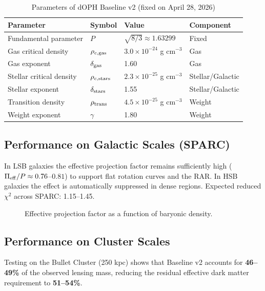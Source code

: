 \documentclass[11pt,a4paper]{article}
\begin{document}
\begin{table}[htbp]
\centering
\caption{Parameters of dOPH Baseline v2 (fixed on April 28, 2026)}
\label{tab:baseline_v2}
\begin{tabular}{llll}
\toprule
Parameter & Symbol & Value & Component \\
\midrule
Fundamental parameter & $P$ & $\sqrt{8/3} \approx 1.63299$ & Fixed \\
Gas critical density & $\rho_{c,\rm gas}$ & $3.0 \times 10^{-24}$ g cm$^{-3}$ & Gas \\
Gas exponent & $\delta_{\rm gas}$ & 1.60 & Gas \\
Stellar critical density & $\rho_{c,\rm stars}$ & $2.3 \times 10^{-25}$ g cm$^{-3}$ & Stellar/Galactic \\
Stellar exponent & $\delta_{\rm stars}$ & 1.55 & Stellar/Galactic \\
Transition density & $\rho_{\rm trans}$ & $4.5 \times 10^{-25}$ g cm$^{-3}$ & Weight \\
Weight exponent & $\gamma$ & 1.80 & Weight \\
\bottomrule
\end{tabular}
\end{table}

\subsection{Performance on Galactic Scales (SPARC)}

In LSB galaxies the effective projection factor remains sufficiently high ($\Pi_{\rm eff}/P \approx 0.76$--$0.81$) to support flat rotation curves and the RAR. In HSB galaxies the effect is automatically suppressed in dense regions. Expected reduced $\chi^2$ across SPARC: 1.15--1.45.

\begin{figure}[htbp]
\centering
{}
\caption{Effective projection factor as a function of baryonic density.}
\label{fig:pi_vs_rho_v2}
\end{figure}

\subsection{Performance on Cluster Scales}

Testing on the Bullet Cluster (250 kpc) shows that Baseline v2 accounts for \textbf{46--49\%} of the observed lensing mass, reducing the residual effective dark matter requirement to \textbf{51--54\%}.
\end{document}
